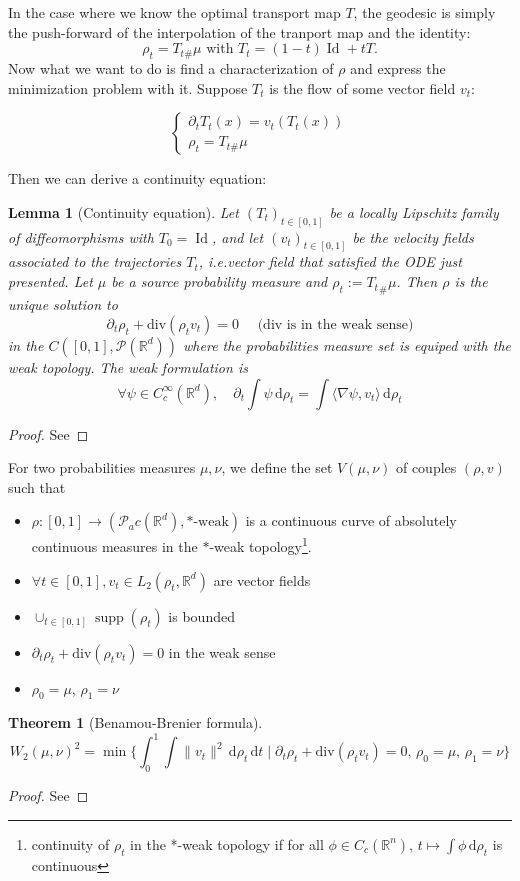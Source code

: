 \documentclass[a4paper]{article}
\newtheorem{theoreme}{Theorem} %
\newtheorem{lemme}{Lemma} %
\theoremstyle{definition}
\theoremstyle{remark}
\DeclareMathOperator*{\supp}{supp}
\DeclareMathOperator*{\Id}{Id}
\newcommand{\dd}{\,\mathrm{d}}
\newcommand{\R}{\mathbb{R}}
\newcommand{\ie}{i.e.\;}
\newcommand{\ps}[2]{\langle#1,#2\rangle}
\renewcommand{\div}{\mathrm{div}}
\begin{document}
In the case where we know the optimal transport map $T$, the geodesic is simply the push-forward of the interpolation of the tranport map and the identity:
$$\rho_t = T_{t\#}\mu \text{ with } T_t = (1-t)\Id + tT.$$
Now what we want to do is find a characterization of $\rho$ and express the minimization problem with it.
Suppose $T_t$ is the flow of some vector field $v_t$:

$$\begin{cases}
    \partial_tT_t(x) = v_t(T_t(x)) \\
    \rho_t = T_{t\#}\mu
\end{cases}$$

Then we can derive a continuity equation:
\begin{lemme}[Continuity equation] \label{lem:continuity}
    Let $(T_t)_{t\in[0,1]}$ be a locally Lipschitz family of diffeomorphisms with $T_0=\Id$, and let $(v_t)_{t\in[0,1]}$ be the velocity fields associated to the trajectories $T_t$, \ie vector field that satisfied the ODE just presented. Let $\mu$ be a source probability measure and $\rho_t:={T_t}_{\#}\mu$. Then  $\rho$ is the unique solution to
    $$\partial_t\rho_t + \div(\rho_t v_t) = 0 \quad\text{ ($\div$ is in the weak sense)}$$
    in the $C([0,1],\mathcal{P}(\R^d))$ where the probabilities measure set is equiped with the weak topology. The weak formulation is 
    $$\forall \psi\in C_c^\infty(\R^d), \quad \partial_t\int \psi\dd\rho_t = \int\ps{\nabla\psi}{v_t}\dd\rho_t$$
\end{lemme}
\begin{proof} See \end{proof}
For two probabilities measures $\mu,\nu$, we define the set $V(\mu,\nu)$ of couples $(\rho,v)$ such that 
\begin{itemize}
    \item $\rho:[0,1]\to (\mathcal{P}_ac(\R^d),*\text{-weak})$ is a continuous curve of absolutely continuous measures in the $*$-weak topology\footnote{continuity of $\rho_t$ in the *-weak topology if for all $\phi\in C_c(\R^n),\, t\mapsto \int \phi \dd \rho_t$ is continuous}.
    \item $\forall t\in[0,1], v_t\in L_2(\rho_t,\R^d)$ are vector fields
    \item $\cup_{t\in[0,1]}\supp(\rho_t)$ is bounded
    \item $\partial_t \rho_t + \div(\rho_tv_t)=0$ in the weak sense
    \item $\rho_0=\mu$, $\rho_1=\nu$
\end{itemize}
\begin{theoreme}[Benamou-Brenier formula] \label{thm:BB}
    $$W_2(\mu,\nu)^2 = \min \bigg\{\int_0^1\int \|v_t\|^2 \dd\rho_t\dd t \;\bigg|\; \partial_t\rho_t + \div(\rho_t v_t) = 0,\, \rho_0=\mu,\, \rho_1=\nu \bigg\}$$
\end{theoreme}
\begin{proof}See  \end{proof}
\end{document}
